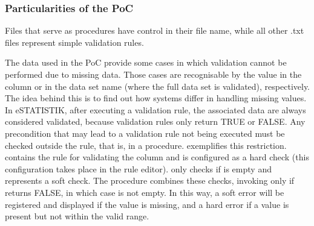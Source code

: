 \subsubsection{Particularities of the PoC}

Files that serve as procedures have control in their file name, while all other .txt files represent simple validation rules.


The data used in the PoC provide some cases in which validation cannot be performed due to missing data. Those cases are recognisable by the value  in the column  or in the data set name (where the full data set is validated), respectively. The idea behind this is to find out how systems differ in handling missing values. In eSTATISTIK, after executing a validation rule, the associated data are always considered validated, because validation rules only return TRUE or FALSE. Any precondition that may lead to a validation rule not being executed must be checked outside the rule, that is, in a procedure.
 exemplifies this restriction.  contains the
rule for validating the column   and is configured as a
hard check (this configuration takes place in the rule editor).
 only checks if  is empty and
represents a soft check. The procedure  combines
these checks, invoking  only if
 returns FALSE, in which case 
is not empty. In this way, a soft error will be registered and displayed if the
value is missing, and a hard error if a value is present but not within the
valid range.



